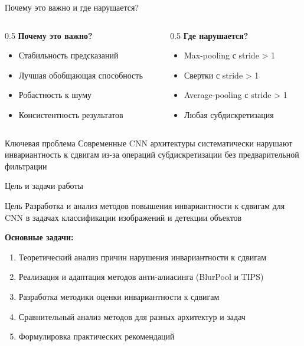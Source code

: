 \documentclass[aspectratio=169]{beamer}
\begin{document}
\begin{frame}{Почему это важно и где нарушается?}
    \begin{columns}
        \begin{column}{0.5\textwidth}
            \textbf{Почему это важно?}
            \begin{itemize}
                \item Стабильность предсказаний
                \item Лучшая обобщающая способность
                \item Робастность к шуму
                \item Консистентность результатов
            \end{itemize}
        \end{column}
        \begin{column}{0.5\textwidth}
            \textbf{Где нарушается?}
            \begin{itemize}
                \item Max-pooling с stride > 1
                \item Свертки с stride > 1
                \item Average-pooling с stride > 1
                \item Любая субдискретизация
            \end{itemize}
        \end{column}
    \end{columns}
    
    \vspace{1cm}
    
    \begin{alertblock}{Ключевая проблема}
        Современные CNN архитектуры систематически нарушают инвариантность к сдвигам из-за операций субдискретизации без предварительной фильтрации
    \end{alertblock}
\end{frame}



\begin{frame}{Цель и задачи работы}
    \begin{block}{Цель}
        Разработка и анализ методов повышения инвариантности к сдвигам для CNN в задачах классификации изображений и детекции объектов
    \end{block}
    
    \textbf{Основные задачи:}
    \begin{enumerate}
        \item Теоретический анализ причин нарушения инвариантности к сдвигам
        \item Реализация и адаптация методов анти-алиасинга (BlurPool и TIPS)
        \item Разработка методики оценки инвариантности к сдвигам
        \item Сравнительный анализ методов для разных архитектур и задач
        \item Формулировка практических рекомендаций
    \end{enumerate}
\end{frame}
\end{document}
